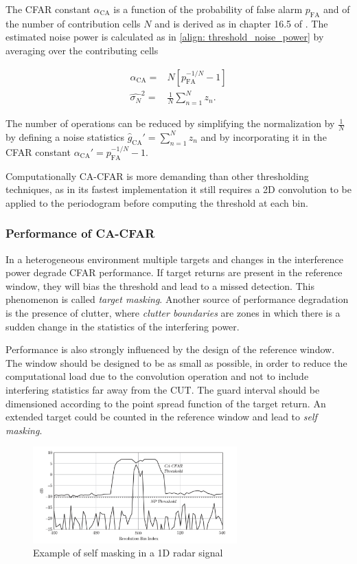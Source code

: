 The CFAR constant $\alpha_{\text{CA}}$ is a function of the probability of false alarm $p_{\text{FA}}$ and of the number of contribution cells $N$ and is derived as in chapter 16.5 of \cite{Richards_Scheer_Holm_2010}. The estimated noise power is calculated as in \ref{align: threshold_noise_power} by averaging over the contributing cells

\begin{align}
	\alpha_{\text{CA}} =& N[p_{\text{FA}}^{-1/N} - 1] \\
	\hat{\sigma_N}^2 =& \frac{1}{N}\sum_{n=1}^N z_n.
\end{align}

The number of operations can be reduced by simplifying the normalization by $\frac{1}{N}$ by defining a noise statistics $\hat{g}_{\text{CA}}' = \sum_{n=1}^N z_n$ and by incorporating it in the CFAR constant $\alpha_{\text{CA}}' = p_{\text{FA}}^{-1/N} - 1$.

Computationally CA-CFAR is more demanding than other thresholding techniques, as in its fastest implementation it still requires a 2D convolution to be applied to the periodogram before computing the threshold at each bin.

\subsubsection{Performance of CA-CFAR}

In a heterogeneous environment multiple targets and changes in the interference power degrade CFAR performance. If target returns are present in the reference window, they will bias the threshold and lead to a missed detection. This phenomenon is called \textit{target masking}. Another source of performance degradation is the presence of clutter, where \textit{clutter boundaries} are zones in which there is a sudden change in the statistics of the interfering power.

Performance is also strongly influenced by the design of the reference window. The window should be designed to be as small as possible, in order to reduce the computational load due to the convolution operation and not to include interfering statistics far away from the CUT. The guard interval should be dimensioned according to the point spread function of the target return. An extended target could be counted in the reference window and lead to \textit{self masking}.

	\begin{figure}[H]
		\centering
		\includegraphics[width=0.7\textwidth]{Images/radar_detect_threshold/self_masking_Richards2010.png}
		\caption{Example of self masking in a 1D radar signal \cite{Richards_Scheer_Holm_2010}}
		\label{fig:self_masking_Richards2010}
	\end{figure}

